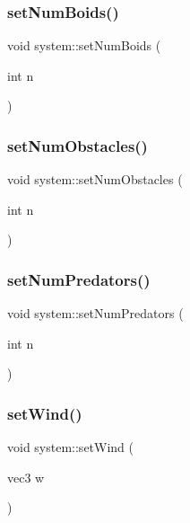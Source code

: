 \mbox{\label{classsystem_a5fb36e621729607b03513a73d4ebc7cf}} 
\subsubsection{\texorpdfstring{set\+Num\+Boids()}{setNumBoids()}}
{\footnotesize\ttfamily void system\+::set\+Num\+Boids (\begin{DoxyParamCaption}\item[{int}]{n }\end{DoxyParamCaption})}

\mbox{\label{classsystem_a98b6209781db025c0bdf7a0f37547082}} 
\subsubsection{\texorpdfstring{set\+Num\+Obstacles()}{setNumObstacles()}}
{\footnotesize\ttfamily void system\+::set\+Num\+Obstacles (\begin{DoxyParamCaption}\item[{int}]{n }\end{DoxyParamCaption})}

\mbox{\label{classsystem_a5f11de22e04d7dc0e3530ba192230310}} 
\subsubsection{\texorpdfstring{set\+Num\+Predators()}{setNumPredators()}}
{\footnotesize\ttfamily void system\+::set\+Num\+Predators (\begin{DoxyParamCaption}\item[{int}]{n }\end{DoxyParamCaption})}

\mbox{\label{classsystem_a6de36540f491c1098abf14a8ea6a0396}} 
\subsubsection{\texorpdfstring{set\+Wind()}{setWind()}}
{\footnotesize\ttfamily void system\+::set\+Wind (\begin{DoxyParamCaption}\item[{vec3}]{w }\end{DoxyParamCaption})}

